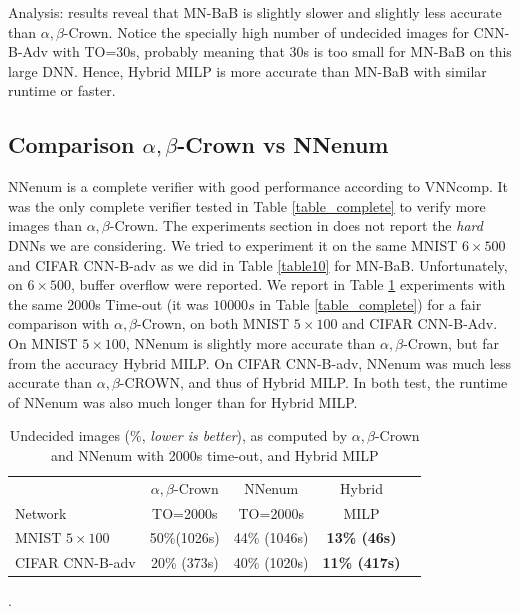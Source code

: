 Analysis: results reveal that MN-BaB is slightly slower and slightly less accurate than $\alpha,\beta$-Crown. Notice the specially high number of undecided images for CNN-B-Adv with TO=30s, probably meaning that 30s is too small for MN-BaB on this large DNN.
Hence, Hybrid MILP is more accurate than MN-BaB with similar runtime or faster.



	\subsection*{Comparison $\alpha,\beta$-Crown vs NNenum}

NNenum \cite{nnenum} is a complete verifier with good performance according to VNNcomp.
It was the only complete verifier tested in Table \ref{table_complete} to verify more images than $\alpha,\beta$-Crown. The experiments section in \cite{nnenum} does not report
the {\em hard} DNNs we are considering. We tried to experiment it on the same MNIST 
$6 \times 500$ and CIFAR CNN-B-adv as we did in Table \ref{table10} for MN-BaB. Unfortunately, on $6 \times 500$, buffer overflow were reported.
We report in Table \ref{table11} experiments with the same 2000s Time-out (it was $10 000s$ in Table \ref{table_complete})  for a fair comparison with $\alpha,\beta$-Crown, on both 
MNIST $5 \times 100$ and CIFAR CNN-B-Adv. 
On MNIST $5 \times 100$, NNenum is slightly more accurate than $\alpha,\beta$-Crown, but far from the accuracy Hybrid MILP.
On CIFAR CNN-B-adv, NNenum was much less accurate than $\alpha,\beta$-CROWN, and thus of Hybrid MILP. In both test, the runtime of NNenum was also much longer than for Hybrid MILP.


\begin{table}[h!]
	\centering
	\begin{tabular}{||l||c||c||c||c||}
		\hline \hline
		 & $\alpha,\beta$-Crown & NNenum & Hybrid\\ 
		 Network & TO=2000s &  TO=2000s & MILP\\ 
		\hline
		MNIST $5 \times 100$ & 50\%(1026s) & 44\% (1046s) & \bf 13\% (46s)\\ \hline
		CIFAR CNN-B-adv & 20\% (373s) & 40\% (1020s) & \bf 11\% (417s)\\ \hline 
	\end{tabular}
	\caption{Undecided images ($\%$, {\em lower is better}), as computed by $\alpha,\beta$-Crown and NNenum with 2000s time-out, and Hybrid MILP}.
	\label{table11}
\end{table}





